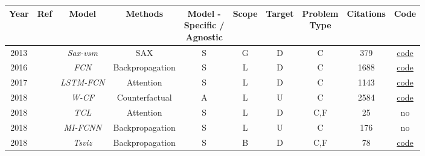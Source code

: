 \begin{table*}[H]
  \centering
  \begin{tabular}{@{}cccccccccc@{}}
    \toprule
    Year        &   Ref                         & Model             & Methods       & \makecell{ Model - \\ Specific / \\ Agnostic}   & Scope         & Target  & \makecell{ Problem \\ Type }                       & Citations         & Code \\
    \midrule

    2013        & \cite{senin_sax-vsm_2013}             &\textit{Sax-vsm}   & SAX           & S      & G        & D      & C                    & 379               & \href{https://github.com/jMotif/sax-vsm_classic}{code}\\ 
    
    2016        &   \cite{wang_time_2016}        & \textit{FCN}      & Backpropagation     & S      & L         & D      & C                    & 1688              & \href{https://github.com/cauchyturing/UCR_Time_Series_Classification_Deep_Learning_Baseline}{code}\\ 

    2017        & \cite{karim_multivariate_2019}             &\textit{\footnotesize{LSTM-FCN}} & Attention     &S       & L         & D      & C                    & 1143              & \href{https://github.com/houshd/LSTM-FCN}{code}\\ 

    2018        & \cite{wachter_counterfactual_2018} & \textit{W-CF} & Counterfactual    & A      & L         & U      & C & 2584 & \href{https://github.com/e-delaney/Instance-Based_CFE_TSC/tree/main/W-CF}{code}\\

    2018        & \cite{vinayavekhin_focusing_2018} &\textit{TCL}& Attention &S        & L         & D      & C,F                           & 25                & no\\  

    2018        & \cite{strodthoff_detecting_2019}  &\textit{\footnotesize{MI-FCNN}}   & Backpropagation     &S       & L         & U   & C                    & 176               & no\\ 

    2018        & \cite{siddiqui_tsviz_2019}       &\textit{Tsviz}     & Backpropagation     &S       & B          & D      & C,F                    & 78                & \href{https://github.com/shoaibahmed/TSViz-Core}{code}\\


\end{tabular}
\end{table*}
